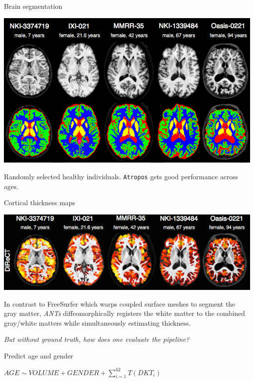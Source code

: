 \documentclass[ignorenonframetext,]{beamer}
\begin{document}
\begin{frame}[fragile]{Brain segmentation}

\includegraphics{./evaluation/figures/brainSegmentation.png}

Randomly selected healthy individuals. \texttt{Atropos} gets good
performance across ages.

\end{frame}

\begin{frame}{Cortical thickness maps}

\includegraphics{./evaluation/figures/corticalThicknessEstimation.png}

In contrast to FreeSurfer which warps coupled surface meshes to segment
the gray matter, \emph{ANTs} diffeomorphically registers the white
matter to the combined gray/white matters while simultaneously
estimating thickness.

\end{frame}

\begin{frame}

\emph{But without ground truth, how does one evaluate the pipeline?}

\end{frame}

\begin{frame}{Predict age and gender}

\(AGE \sim VOLUME + GENDER + \sum_{i=1}^{62} T(DKT_i)\)

\end{frame}
\end{document}
